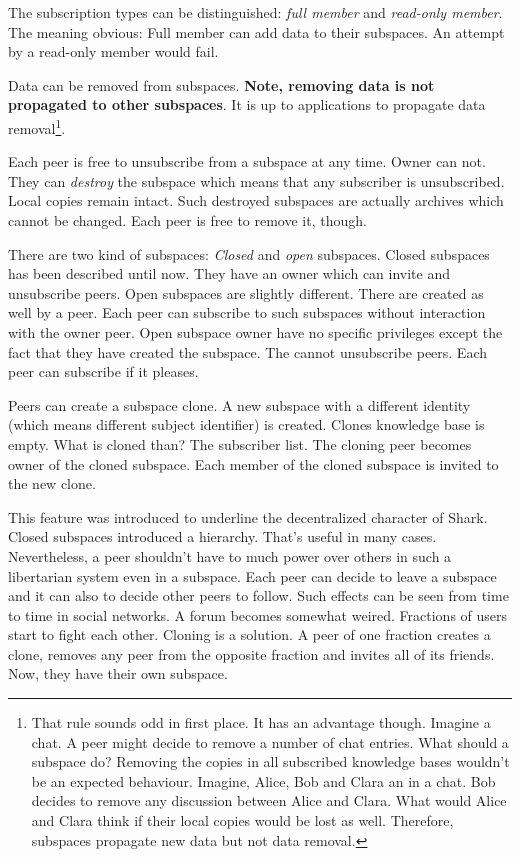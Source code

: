 The subscription types can be distinguished: {\it full member} and {\it read-only member}. The meaning obvious: Full member can add data to their subspaces. An attempt by a read-only member would fail. 

Data can be removed from subspaces. {\bf Note, removing data is not propagated to other subspaces}. It is up to applications to propagate data removal\footnote{That rule sounds odd in first place. It has an advantage though. Imagine a chat. A peer might decide to remove a number of chat entries. What should a subspace do? Removing the copies in all subscribed knowledge bases wouldn't be an expected behaviour. Imagine, Alice, Bob and Clara an in a chat. Bob decides to remove any discussion between Alice and Clara. What would Alice and Clara think if their local copies would be lost as well. Therefore, subspaces propagate new data but not data removal.}.

Each peer is free to unsubscribe from a subspace at any time. Owner can not. They can {\it destroy} the subspace which means that any subscriber is unsubscribed. Local copies remain intact. Such destroyed subspaces are actually
archives which cannot be changed. Each peer is free to remove it, though.

There are two kind of subspaces: {\it Closed} and {\it open} subspaces. Closed subspaces has been described until now. They have an owner which can invite and unsubscribe peers. Open subspaces are slightly different. There are created as well by a peer. Each peer can subscribe to such subspaces without interaction with the owner peer. Open subspace owner have no specific privileges except the fact that they have created the subspace. The cannot unsubscribe peers. Each peer can subscribe if it pleases.

Peers can create a subspace clone. A new subspace with a different identity (which means different subject identifier) is created. Clones knowledge base is empty. What is cloned than? The subscriber list. The cloning peer becomes owner of the cloned subspace. Each member of the cloned subspace is invited to the new clone. 

This feature was introduced to underline the decentralized character of Shark. Closed subspaces introduced a hierarchy. That's useful in many cases. Nevertheless, a peer shouldn't have to much power over others in such a libertarian system even in a subspace. Each peer can decide to leave a subspace and it can also to decide other peers to follow. Such effects can be seen from time to time in social networks. A forum becomes somewhat weired. Fractions of users start to fight each other. Cloning is a solution. A peer of one fraction creates a clone, removes any peer from the opposite fraction and invites all of its friends. Now, they have their own subspace.

